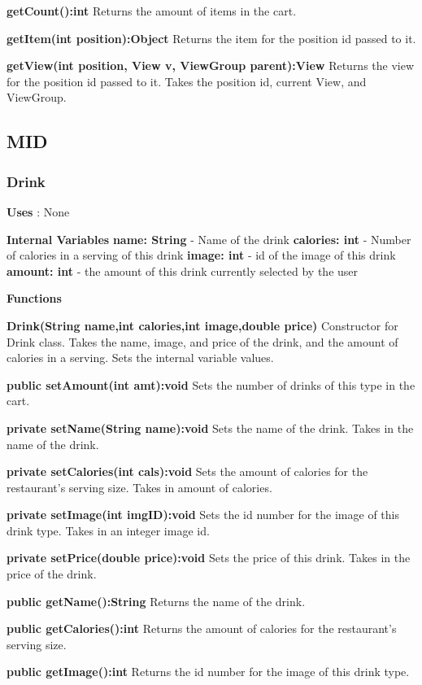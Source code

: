 \documentclass [10pt]{article}
\begin{document}
\textbf{getCount():int}
Returns the amount of items in the cart.

\textbf{getItem(int position):Object}
Returns the item for the position id passed to it.

\textbf{getView(int position, View v, ViewGroup parent):View}
Returns the view for the position id passed to it. Takes the position id, current View, and ViewGroup.

\subsection{MID}

\subsubsection{Drink}

\textbf{Uses} : None

\textbf{Internal Variables}
\textbf{name: String} - Name of the drink
\textbf{calories: int} - Number of calories in a serving of this drink
\textbf{image: int} - id of the image of this drink
\textbf{amount: int} - the amount of this drink currently selected by the user

\textbf{Functions}

\textbf{Drink(String name,int calories,int image,double price)}
Constructor for Drink class. Takes the name, image, and price of the drink, and the amount of calories in a serving. Sets the internal variable values.

\textbf{public setAmount(int amt):void}
Sets the number of drinks of this type in the cart.

\textbf{private setName(String name):void}
Sets the name of the drink. Takes in the name of the drink.

\textbf{private setCalories(int cals):void}
Sets the amount of calories for the restaurant’s serving size. Takes in amount of calories.

\textbf{private setImage(int imgID):void}
Sets the id number for the image of this drink type. Takes in an integer image id.

\textbf{private setPrice(double price):void}
Sets the price of this drink. Takes in the price of the drink.

\textbf{public getName():String}
Returns the name of the drink.

\textbf{public getCalories():int}
Returns the amount of calories for the restaurant’s serving size.

\textbf{public getImage():int}
Returns the id number for the image of this drink type.
\end{document}
